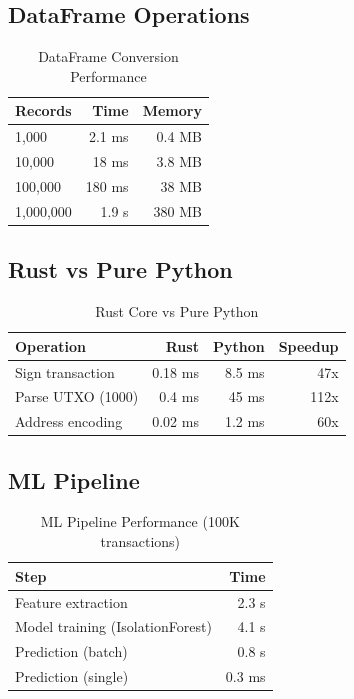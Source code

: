 \documentclass[11pt,twocolumn]{article}
\begin{document}
\subsection{DataFrame Operations}

\begin{table}[h]
\centering
\caption{DataFrame Conversion Performance}
\begin{tabular}{lrr}
\toprule
\textbf{Records} & \textbf{Time} & \textbf{Memory} \\
\midrule
1,000 & 2.1 ms & 0.4 MB \\
10,000 & 18 ms & 3.8 MB \\
100,000 & 180 ms & 38 MB \\
1,000,000 & 1.9 s & 380 MB \\
\bottomrule
\end{tabular}
\end{table}

\subsection{Rust vs Pure Python}

\begin{table}[h]
\centering
\caption{Rust Core vs Pure Python}
\begin{tabular}{lrrr}
\toprule
\textbf{Operation} & \textbf{Rust} & \textbf{Python} & \textbf{Speedup} \\
\midrule
Sign transaction & 0.18 ms & 8.5 ms & 47x \\
Parse UTXO (1000) & 0.4 ms & 45 ms & 112x \\
Address encoding & 0.02 ms & 1.2 ms & 60x \\
\bottomrule
\end{tabular}
\end{table}

\subsection{ML Pipeline}

\begin{table}[h]
\centering
\caption{ML Pipeline Performance (100K transactions)}
\begin{tabular}{lr}
\toprule
\textbf{Step} & \textbf{Time} \\
\midrule
Feature extraction & 2.3 s \\
Model training (IsolationForest) & 4.1 s \\
Prediction (batch) & 0.8 s \\
Prediction (single) & 0.3 ms \\
\bottomrule
\end{tabular}
\end{table}
\end{document}
